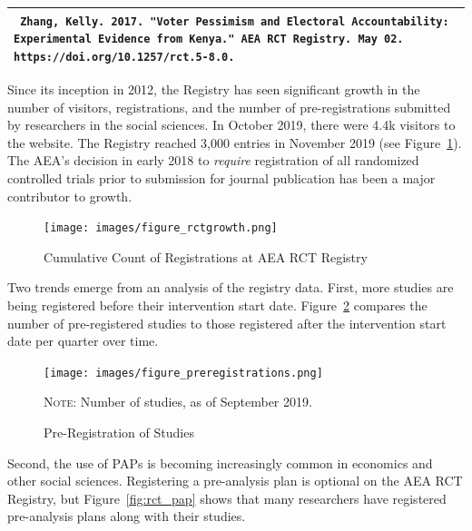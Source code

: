 \documentclass[PP]{AEA}
\begin{document}
\begin{minipage}{0.45\textwidth}

\begin{tabular}{p{\textwidth}}
\toprule
\texttt{
    Zhang, Kelly. 2017. "Voter Pessimism and Electoral Accountability: Experimental Evidence from Kenya." AEA RCT Registry. May 02. https://doi.org/10.1257/rct.5-8.0.
}\\
\bottomrule
\end{tabular}
    \label{fig:rct_citation}
\end{minipage}

Since its inception in 2012, the Registry has seen significant growth in the number of visitors, registrations, and the number of pre-registrations submitted by researchers in the social sciences. In October 2019, there were 4.4k visitors to the website. The Registry reached 3,000 entries in November 2019 (see Figure~\ref{fig:rct_cumulative}).  The AEA’s decision in early 2018 to \textit{require} registration of all randomized controlled trials prior to submission for journal publication  has been a major contributor to growth. 

\begin{figure}
    \texttt{[image: images/figure\_rctgrowth.png]}
    \caption{Cumulative Count of Registrations at AEA RCT Registry\label{fig:rct_cumulative}}
	
\end{figure} 

Two trends emerge from an analysis of the registry data. First, more studies are being registered before their intervention start date. Figure~\ref{fig:rct_pre} compares the number of pre-registered studies to those registered after the intervention start date per quarter over time. 


\begin{figure}[h]
	\texttt{[image: images/figure\_preregistrations.png]}
	\caption{Pre-Registration of Studies\label{fig:rct_pre}}
	
	\centering \footnotesize \textsc{Note:} Number of studies, as of September 2019.
\end{figure} 

Second, the use of \acp{PAP} is becoming increasingly common in economics and other social sciences. Registering a pre-analysis plan is optional on the AEA RCT Registry, but  Figure~\ref{fig:rct_pap} shows that many researchers have registered pre-analysis plans along with their studies.
\end{document}
